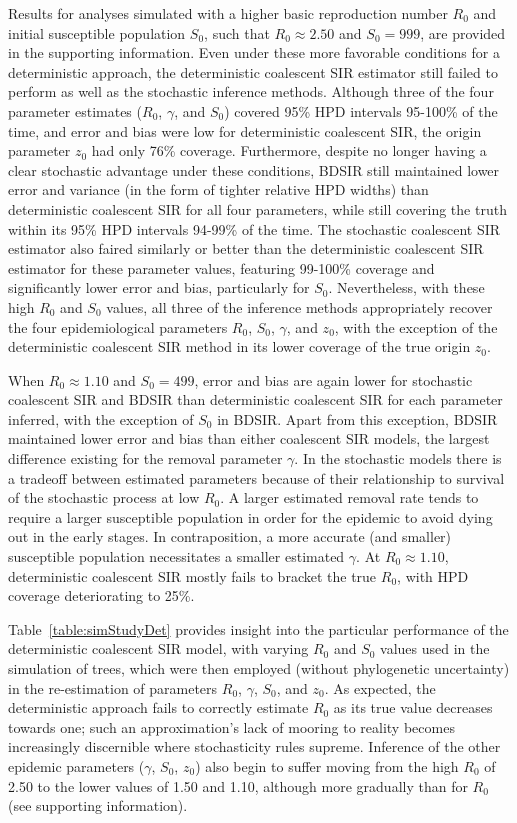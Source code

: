 \documentclass[12pt,titlepage]{article}
\newcommand{\stochCoalSIR}{stochastic coalescent SIR}
\newcommand{\deterCoalSIR}{deterministic coalescent SIR}
\newcommand{\BDSIR}{BDSIR}
\begin{document}
Results for analyses simulated with a higher basic reproduction number $R_0$ and initial susceptible population $S_0$, 
such that $R_0\approx2.50$ and $S_0 = 999$, are provided in the supporting information.  Even under these more favorable conditions for 
a deterministic approach, the deterministic coalescent SIR estimator still failed to perform as well as the stochastic inference methods.  
Although three of the four parameter estimates  ($R_0$, $\gamma$, and $S_0$) covered 95\% HPD intervals 95-100\% of the time, 
and error and bias were low for deterministic coalescent SIR, the origin parameter $z_0$ had only 76\% coverage.  
Furthermore, despite no longer having a clear stochastic advantage under these conditions, \BDSIR{} still maintained lower error and variance 
(in the form of tighter relative HPD widths) than \deterCoalSIR{} for all four parameters, while still covering the truth within 
its 95\% HPD intervals 94-99\% of the time. The stochastic coalescent SIR estimator also faired similarly or better than the deterministic coalescent SIR estimator for these parameter values, 
featuring 99-100\% coverage and significantly lower error and bias, particularly for $S_0$.
Nevertheless, with these high $R_0$ and $S_0$ values, all three of the inference methods
appropriately recover the four epidemiological parameters $R_0$, $S_0$, $\gamma$, and $z_0$, with the exception 
of the deterministic coalescent SIR method in its lower coverage of the true origin $z_0$.


When $R_{0}\approx1.10$ and $S_{0}=499$, error and bias are again lower for \stochCoalSIR{} and \BDSIR{} than \deterCoalSIR{} for 
each parameter inferred, with the exception of $S_0$ in \BDSIR{}.  Apart from this exception, \BDSIR{} maintained lower error 
and bias than either coalescent SIR models, the largest difference existing for the removal parameter $\gamma$. In the stochastic models there 
is a tradeoff between estimated parameters because of their relationship to survival of the stochastic process at low $R_0$.  
A larger estimated removal rate tends to require a larger susceptible population in order for the epidemic to avoid dying out in the early 
stages.  In contraposition, a more accurate (and smaller) susceptible population necessitates a smaller estimated $\gamma$.
At $R_0\approx1.10$, \deterCoalSIR{} mostly fails to bracket the true $R_0$, with HPD coverage deteriorating to 25\%.
%
%

Table~\ref{table:simStudyDet} provides insight into the particular performance of the deterministic coalescent SIR model, with varying $R_0$ and $S_0$ values used in the simulation of trees, which were then employed (without phylogenetic uncertainty) in the re-estimation of parameters $R_0$, $\gamma$, $S_0$, and $z_0$.  As expected, the 
deterministic approach fails to correctly estimate $R_0$ as its true value decreases towards one; such an approximation's lack of mooring to reality becomes increasingly discernible where stochasticity rules supreme.  Inference of the other epidemic parameters ($\gamma$, $S_0$, $z_0$) also 
begin to suffer moving from the high $R_0$ of 2.50 to the lower values of 1.50 and 1.10, although more gradually than for $R_0$ (see supporting information).
\end{document}
